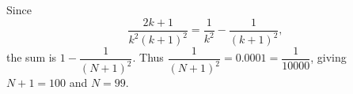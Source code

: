 Since
\[
\dfrac{2k+1}{k^2(k+1)^2}=\dfrac{1}{k^2}-\dfrac{1}{(k+1)^2},
\]
the sum is $1-\dfrac{1}{(N+1)^2}$. Thus $\dfrac{1}{(N+1)^2}=0.0001=\dfrac{1}{10000}$, giving $N+1=100$ and $\boxed{N=99}$.
